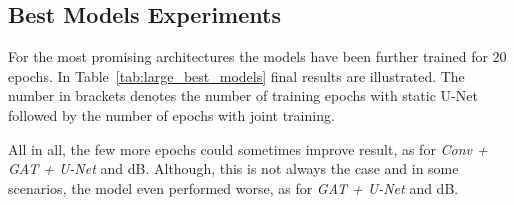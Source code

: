 \subsection{Best Models Experiments}
For the most promising architectures the models have been further trained for 20 epochs. 
In Table~\ref{tab:large_best_models} final results are illustrated. 
The number in brackets denotes the number of training epochs with static U-Net followed by
the number of epochs with joint training.

All in all, the few more epochs could sometimes improve result, as for \textit{Conv + GAT + U-Net} and  dB.
Although, this is not always the case and in some scenarios, the model even performed worse, as for 
\textit{GAT + U-Net} and  dB.


\begin{table}[H]
  \centering
  \caption{Large Scale Experiment: Baseline results.}
  \label{tab:large_best_models}
\end{table}

